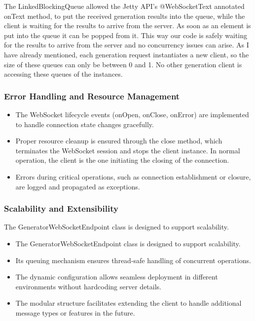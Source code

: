 				The LinkedBlockingQueue allowed the Jetty API's @WebSocketText annotated onText method, to put the received generation
				results into the queue, while the client is waiting for the results to arrive from the server. As soon as an element is put into the queue
				it can be popped from it. This way our code is safely waiting for the results
				to arrive from the server and no concurrency issues can arise. As I have already mentioned, each generation request instantiates a new
				client, so the size of these queues can only be between 0 and 1. No other generation client is accessing these queues of the instances.

			\subsubsection{Error Handling and Resource Management}
				\begin{itemize}
					\item The WebSocket lifecycle events (onOpen, onClose, onError) are implemented to handle connection state changes gracefully.
					\item Proper resource cleanup is ensured through the close method, which terminates the WebSocket session and stops the client instance.
					In normal operation, the client is the one initiating the closing of the connection.
					\item Errors during critical operations, such as connection establishment or closure, are logged and propagated as exceptions.
				\end{itemize} 

			\subsubsection{Scalability and Extensibility} 
				The GeneratorWebSocketEndpoint class is designed to support scalability.
				\begin{itemize}
					\item The GeneratorWebSocketEndpoint class is designed to support scalability.
					\item Its queuing mechanism ensures thread-safe handling of concurrent operations.
					\item The dynamic configuration allows seamless deployment in different environments without hardcoding server details.
					\item The modular structure facilitates extending the client to handle additional message types or features in the future.
				\end{itemize} 

